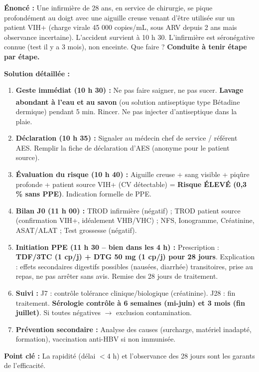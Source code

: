 \documentclass[11pt]{article}
\begin{document}
\begin{exoresolu}
\textbf{Énoncé :} Une infirmière de 28 ans, en service de chirurgie, se pique profondément au doigt avec une aiguille creuse venant d'être utilisée sur un patient VIH+ (charge virale 45 000 copies/mL, sous ARV depuis 2 ans mais observance incertaine). L'accident survient à 10 h 30. L'infirmière est séronégative connue (test il y a 3 mois), non enceinte. Que faire ? \textbf{Conduite à tenir étape par étape.}

\textbf{Solution détaillée :}
\begin{enumerate}
    \item \textbf{Geste immédiat (10 h 30) :} Ne pas faire saigner, ne pas sucer. \textbf{Lavage abondant à l'eau et au savon} (ou solution antiseptique type Bétadine\textsuperscript{\textregistered} dermique) pendant 5 min. Rincer. Ne pas injecter d'antiseptique dans la plaie.
    \item \textbf{Déclaration (10 h 35) :} Signaler au médecin chef de service / référent AES. Remplir la fiche de déclaration d'AES (anonyme pour le patient source).
    \item \textbf{Évaluation du risque (10 h 40) :} Aiguille creuse + sang visible + piqûre profonde + patient source VIH+ (CV détectable) = \textbf{Risque ÉLEVÉ (0,3 \% sans PPE)}. Indication formelle de PPE.
    \item \textbf{Bilan J0 (11 h 00) :} TROD infirmière (négatif) ; TROD patient source (confirmation VIH+, idéalement VHB/VHC) ; NFS, Ionogramme, Créatinine, ASAT/ALAT ; Test grossesse (négatif).
    \item \textbf{Initiation PPE (11 h 30 -- bien dans les 4 h) :} Prescription : \textbf{TDF/3TC (1 cp/j) + DTG 50 mg (1 cp/j) pour 28 jours}. Explication : effets secondaires digestifs possibles (nausées, diarrhée) transitoires, prise au repas, ne pas arrêter sans avis. Remise des 28 jours de traitement.
    \item \textbf{Suivi :} J7 : contrôle tolérance clinique/biologique (créatinine). J28 : fin traitement. \textbf{Sérologie contrôle à 6 semaines (mi-juin) et 3 mois (fin juillet)}. Si toutes négatives $\rightarrow$ exclusion contamination.
    \item \textbf{Prévention secondaire :} Analyse des causes (surcharge, matériel inadapté, formation), vaccination anti-HBV si non immunisée.
\end{enumerate}
\textbf{Point clé :} La rapidité (délai $< 4$ h) et l'observance des 28 jours sont les garants de l'efficacité.
\end{exoresolu}
\end{document}
